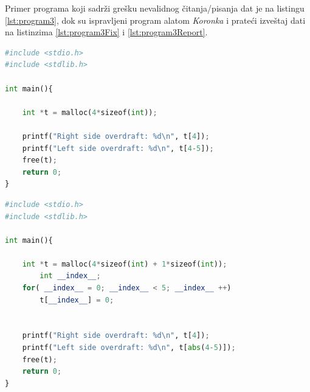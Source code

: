 \documentclass[12pt,oneside]{memoir}
\theoremstyle{plain}
\theoremstyle{definition}
\begin{document}
Primer programa koji sadrži grešku nevalidnog čitanja/pisanja dat je na listingu \ref{lst:program3}, dok su ispravljeni program alatom \textit{Koronka} i prateći izveštaj dati na listinzima \ref{lst:program3Fix} i \ref{lst:program3Report}.

\begin{lstlisting}[style=mystyle,caption={Program koji sadrži grešku nevalidnog čitanja/pisanja}, label={lst:program3},language={Python}] 
#include <stdio.h>
#include <stdlib.h>

int main(){

	int *t = malloc(4*sizeof(int));

	printf("Right side overdraft: %d\n", t[4]);
	printf("Left side overdraft: %d\n", t[4-5]);
	free(t); 
	return 0;
}
\end{lstlisting}

\begin{lstlisting}[style=mystyle,caption={Predlog rešenja alata \textit{Koronka} za greške otkrivene u programu sa listinga \ref{lst:program3}}, label={lst:program3Fix},language={Python}] 
#include <stdio.h>
#include <stdlib.h>

int main(){

	int *t = malloc(4*sizeof(int) + 1*sizeof(int));
		int __index__;
	for( __index__ = 0; __index__ < 5; __index__ ++)
		t[__index__] = 0;


	printf("Right side overdraft: %d\n", t[4]);
	printf("Left side overdraft: %d\n", t[abs(4-5)]);
	free(t); 
	return 0;
}
\end{lstlisting}
\end{document}
